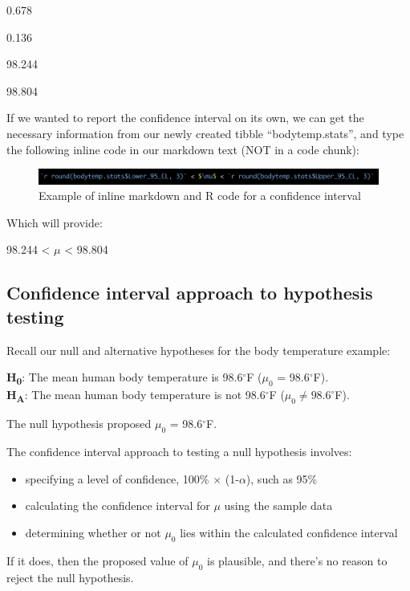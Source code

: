 \documentclass[
]{book}
\providecommand{\tightlist}{%
  \setlength{\itemsep}{0pt}\setlength{\parskip}{0pt}}
\begin{document}
0.678

0.136

98.244

98.804

If we wanted to report the confidence interval on its own, we can get the necessary information from our newly created tibble ``bodytemp.stats'', and type the following inline code in our markdown text (NOT in a code chunk):

\begin{figure}
\includegraphics[width=27.81in]{./more/confint_inline_code} \caption{Example of inline markdown and R code for a confidence interval}\label{fig:unnamed-chunk-80}
\end{figure}

Which will provide:

98.244 \textless{} \(\mu\) \textless{} 98.804

\subsection{Confidence interval approach to hypothesis testing}\label{conf_hyp}

Recall our null and alternative hypotheses for the body temperature example:

\textbf{H\textsubscript{0}}: The mean human body temperature is 98.6\(^\circ\)F (\(\mu_0\) = 98.6\(^\circ\)F).\\
\textbf{H\textsubscript{A}}: The mean human body temperature is not 98.6\(^\circ\)F (\(\mu_0 \ne 98.6^\circ\)F).

The null hypothesis proposed \(\mu_0\) = 98.6\(^\circ\)F.

The confidence interval approach to testing a null hypothesis involves:

\begin{itemize}
\tightlist
\item
  specifying a level of confidence, 100\% \(\times\) (1-\(\alpha\)), such as 95\%
\item
  calculating the confidence interval for \(\mu\) using the sample data
\item
  determining whether or not \(\mu_0\) lies within the calculated confidence interval
\end{itemize}

If it does, then the proposed value of \(\mu_0\) is plausible, and there's no reason to reject the null hypothesis.
\end{document}
